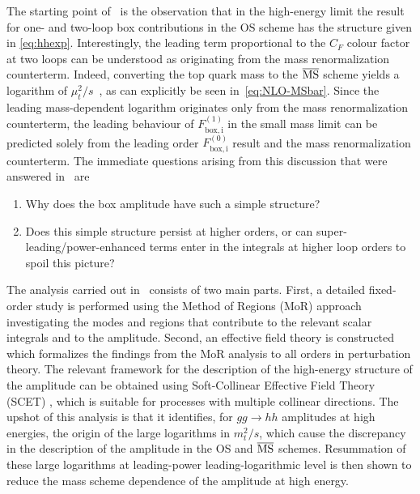The starting point of~\cite{Jaskiewicz:2024xkd} is
the observation that in the high-energy limit the
result for one- and two-loop box contributions in
the $\mathrm{OS}$ scheme has the structure
given in \eqref{eq:hhexp}.
Interestingly, the leading term proportional to the $C_F$ colour factor at two loops can be understood as originating from the mass renormalization counterterm. Indeed,
converting the top quark mass to the $\overline{{\rm{MS}}}$ scheme yields a logarithm of $\mu_t^2/s$~\cite{Baglio:2020ini},
as can explicitly be seen in~\eqref{eq:NLO-MSbar}.
Since the leading mass-dependent logarithm originates only from the mass renormalization counterterm, the leading behaviour of $F_\mathrm{box,i}^{(1)}$ in the small mass limit can be predicted solely from the leading order $F_\mathrm{box,i}^{(0)}$ result and the mass renormalization counterterm.
The immediate questions arising from this discussion
that were answered in~\cite{Jaskiewicz:2024xkd} are
\begin{enumerate}
    \item Why does the box amplitude have such a simple structure?
    \item Does this simple structure persist at higher orders, or can super-leading/power-enhanced terms enter in the integrals at higher loop orders to spoil this picture?
\end{enumerate}
The analysis carried out in~\cite{Jaskiewicz:2024xkd}
consists of two main parts.
First, a detailed fixed-order study is performed using
the Method of Regions (MoR) approach
\cite{Beneke:1997zp, Smirnov:1990rz, Smirnov:1994tg, Smirnov:2002pj}
investigating the modes and regions that contribute to the relevant
scalar integrals and to the amplitude. Second, an effective
field theory is constructed which formalizes the findings
from the MoR analysis to all orders in perturbation theory.
The relevant framework for the description of the
high-energy structure of the amplitude can be obtained using
Soft-Collinear Effective Field Theory (SCET) \cite{Bauer:2000yr, Bauer:2001yt,Bauer:2002nz, Beneke:2002ph, Beneke:2002ni},
which is suitable for processes with multiple collinear directions.
The upshot of this analysis is that it identifies, for $gg\to hh$ amplitudes at
high energies, the origin of the large logarithms
in $m_t^2/s$, which cause the discrepancy in the description of the
amplitude in the OS and $\overline{{\rm{MS}}}$ schemes.
Resummation of these large logarithms at leading-power
leading-logarithmic level is then shown to reduce
the mass scheme dependence of the amplitude at high energy.


